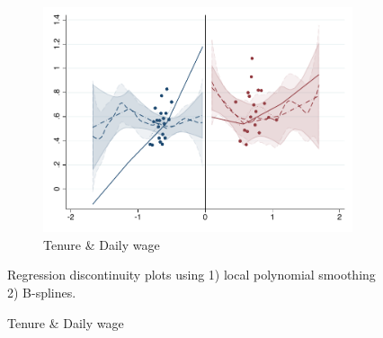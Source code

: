 \documentclass[oneside,11pt]{article}
\begin{document}
\begin{figure}[H]
\begin{center}
\begin{subfigure}{0.31\textwidth}
\caption{Tenure \& Daily wage}
        \includegraphics[width=\textwidth]{Figuras/rdplot_conflicto_arreglado_2_4_2.pdf}
    \end{subfigure}
  \end{center}
  
    \scriptsize Regression discontinuity plots using 1) local polynomial smoothing 2) B-splines.
\end{figure}




\clearpage
\end{document}
